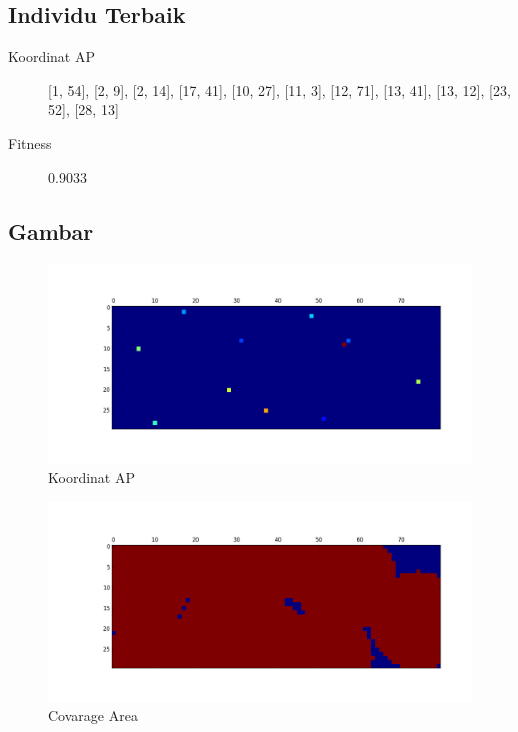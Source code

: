 \documentclass[11pt,a4paper,titlepage]{report}
\begin{document}
	\subsection*{Individu Terbaik}
	\begin{description}
		\item[Koordinat AP] [1, 54], [2, 9], [2, 14], [17, 41], [10, 27], [11, 3], [12, 71], [13, 41], [13, 12], [23, 52], [28, 13]
		\item[Fitness] 0.9033
	\end{description}
	\newpage
	\subsection*{Gambar}
	\begin{figure}[h]
		\centering
		\includegraphics[width=0.9\linewidth]{apLoc_05}
		\caption{Koordinat AP}
		\label{fig:apLoc_05}
	\end{figure}
	\begin{figure}[h]
		\centering
		\includegraphics[width=0.9\linewidth]{coverage_05}
		\caption{Covarage Area}
		\label{fig:coverage_05}
	\end{figure}
\end{document}
